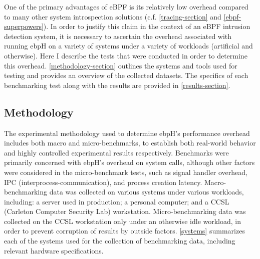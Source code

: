 \documentclass[
  12pt]{findlay}
\begin{document}
\label{measuring_overhead_section}

One of the primary advantages of eBPF is its relatively low overhead
\autocite{gregg19bpf,starovoitov13,starovoitov14} compared to many other
system introspection solutions (c.f. \autoref{tracing-section} and
\autoref{ebpf-superpowers}). In order to justify this claim in the
context of an eBPF intrusion detection system, it is necessary to
ascertain the overhead associated with running ebpH on a variety of
systems under a variety of workloads (artificial and otherwise). Here I
describe the tests that were conducted in order to determine this
overhead. \autoref{methodology-section} outlines the systems and tools
used for testing and provides an overview of the collected datasets. The
specifics of each benchmarking test along with the results are provided
in \autoref{results-section}.

\hypertarget{methodology}{%
\subsection{Methodology}\label{methodology}}

\label{methodology-section}

The experimental methodology used to determine ebpH's performance
overhead includes both macro and micro-benchmarks, to establish both
real-world behavior and highly controlled experimental results
respectively. Benchmarks were primarily concerned with ebpH's overhead
on system calls, although other factors were considered in the
micro-benchmark tests, such as signal handler overhead, IPC
(interprocess-communication), and process creation latency.
Macro-benchmarking data was collected on various systems under various
workloads, including: a server used in production; a personal computer;
and a CCSL (Carleton Computer Security Lab) workstation.
Micro-benchmarking data was collected on the CCSL workstation only under
an otherwise idle workload, in order to prevent corruption of results by
outside factors. \autoref{systems} summarizes each of the systems used
for the collection of benchmarking data, including relevant hardware
specifications.
\end{document}
